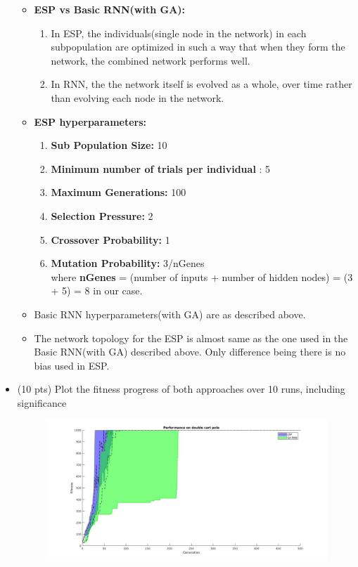 \documentclass{article}
\begin{document}
\begin{itemize}
\begin{itemize}
\begin{itemize}
\begin{enumerate}
	\end{enumerate}
	\end{itemize}
	\item \textbf{ESP vs Basic RNN(with GA):}
	\begin{enumerate}
	\item In ESP, the individuals(single node in the network) in each subpopulation are optimized in such a way that when they form the network, the combined network performs well.
	\item In RNN, the the network itself is evolved as a whole, over time rather than evolving each node in the network.
	\end{enumerate}
	\item \textbf{ESP hyperparameters:}
	\begin{enumerate}
	\item \textbf{Sub Population Size:} 10
	\item \textbf{Minimum number of trials per individual} : 5
	\item \textbf{Maximum Generations:} 100
	\item \textbf{Selection Pressure:} 2
	\item \textbf{Crossover Probability:} 1
	\item \textbf{Mutation Probability:} 3/nGenes\\
	where \textbf{nGenes} = (number of inputs + number of hidden nodes) = (3 + 5) = 8 in our case.
 	\end{enumerate}
 	\item Basic RNN hyperparameters(with GA) are as described above.
 	\item The network topology for the ESP is almost same as the one used in the Basic RNN(with GA) described above. Only difference being there is no bias used in ESP.
	\end{itemize}
	\color{black}
	\item (10 pts) Plot the fitness progress of both approaches over 10 runs, including significance
        \begin{figure}[htpb]
            \centering
            \includegraphics[width=1.0\linewidth]{comparision.jpg}

\end{figure}
\end{itemize}
\end{document}
